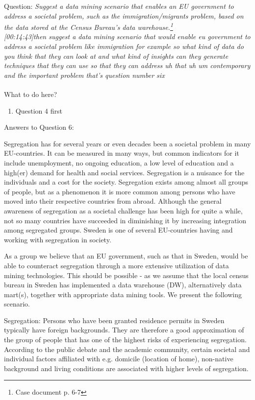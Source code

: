 Question:
\emph{
    Suggest a data mining scenario that enables an EU government to address a societal
problem, such as the immigration/migrants problem, based on the data stored at the
Census Bureau’s data warehouse.\footnote{Case document p. 6-7}
}\\

\emph{[00:14:43]then suggest a data mining scenario that would enable eu government
to address a societal problem like immigration for example so what kind of data do you think
that they can look at and what kind of insights can they generate techniques that they can use
so that they can address uh that uh um contemporary and the important problem that's question number
six}\\\\

What to do here?
\begin{enumerate}
    \item Question 4 first
  \end{enumerate}

\newpage Answers to Question 6:

Segregation has for several years or even decades been a societal problem in many EU-countries. 
It can be measured in many ways, but common indicators for it include unemployment, no ongoing education, 
a low level of education and a high(er) demand for health and social services. 
Segregation is a nuisance for the individuals and a cost for the society. 
Segregation exists among almost all groups of people, 
but as a phenomenon it is more common among persons who have moved into their respective countries from abroad. 
Although the general awareness of segregation as a societal challenge has been high for quite a while, 
not so many countries have succeeded in diminishing it by increasing integration among segregated groups. 
Sweden is one of several EU-countries having and working with segregation in society.  

As a group we believe that an EU government, 
such as that in Sweden, would be able to counteract segregation through a more extensive utilization of data mining technologies. 
This should be possible - as we assume that the local census bureau in Sweden has implemented a data warehouse (DW), 
alternatively data mart(s), together with appropriate data mining tools. 
We present the following scenario. 

Segregation: Persons who have been granted residence permits in Sweden typically have foreign backgrounds. 
They are therefore a good approximation of the group of people that has one of the highest risks of experiencing segregation. 
According to the public debate and the academic community, 
certain societal and individual factors affiliated with e.g. domicile (location of home), 
non-native background and living conditions are associated with higher levels of segregation.  

